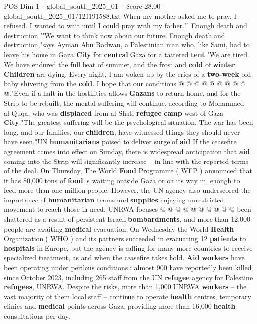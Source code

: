 \begin{textsample}{POS Dim 1 – global\_south\_2025\_01 – Score 28.00 – global\_south\_2025\_01/120191588.txt}
When my mother asked me to pray, I refused.
I wanted to wait until I could pray with my father."' Enough death and destruction '"We want to think now about our future.
Enough death and destruction,"says Ayman Abu Radwan, a Palestinian man who, like Sami, had to leave his home in Gaza \textbf{City} for \textbf{central} Gaza for a tattered \textbf{tent}."We are tired.
We have endured the full heat of summer, and the frost and \textbf{cold} of \textbf{winter}. \textbf{Children} are dying.
Every night, I am woken up by the cries of a \textbf{two-week} old baby shivering from the \textbf{cold}.
I hope that our conditions @ @ @ @ @ @ @ @ @ @."Even if a halt in the hostilities allows \textbf{Gazans} to return home, and for the Strip to be rebuilt, the mental suffering will continue, according to Mohammed al-Quqa, who was \textbf{displaced} from al-Shati \textbf{refugee} \textbf{camp} west of Gaza \textbf{City}."The greatest suffering will be the psychological situation.
The war has been long, and our families, our \textbf{children}, have witnessed things they should never have seen."UN \textbf{humanitarians} poised to deliver surge of \textbf{aid} If the ceasefire agreement comes into effect on Sunday, there is widespread anticipation that \textbf{aid} coming into the Strip will significantly increase -- in line with the reported terms of the deal.
On Thursday, The World \textbf{Food} Programme ( WFP ) announced that it has 80,000 tons of \textbf{food} is waiting outside Gaza or on its way in, enough to feed more than one million people.
However, the UN agency also underscored the importance of \textbf{humanitarian} teams and \textbf{supplies} enjoying unrestricted movement to reach those in need.
UNRWA focuses @ @ @ @ @ @ @ @ @ @ been shattered as a result of persistent Israeli \textbf{bombardments}, and more than 12,000 people are awaiting \textbf{medical} evacuation.
On Wednesday the World \textbf{Health} Organization ( WHO ) and its partners succeeded in evacuating 12 \textbf{patients} to \textbf{hospitals} in Europe, but the agency is calling for many more countries to receive specialized treatment, as and when the ceasefire takes hold. \textbf{Aid} \textbf{workers} have been operating under perilous conditions : almost 900 have reportedly been killed since October 2023, including 265 staff from the UN \textbf{refugee} agency for Palestine \textbf{refugees}, UNRWA.
Despite the risks, more than 1,000 UNRWA \textbf{workers} -- the vast majority of them local staff -- continue to operate \textbf{health} centres, temporary clinics and \textbf{medical} points across Gaza, providing more than 16,000 \textbf{health} consultations per day.

\end{textsample}
